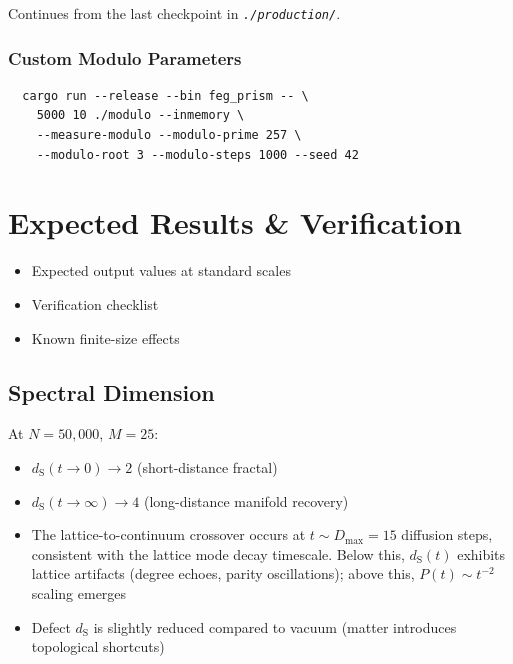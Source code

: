 \documentclass[11pt, a4paper, openany]{book}
\newcommand{\dS}{d_{\mathrm{S}}}
\newcommand{\file}[1]{\texttt{\itshape #1}}
\newenvironment{introduction}[1][Chapter Overview]{%
  \begin{tcolorbox}[
    enhanced,colback=structure!5,colframe=structure,
    colbacktitle=structure,coltitle=white,
    fonttitle=\small\bfseries,title={#1},
    arc=2pt,boxrule=0.7pt,
    left=8pt,right=8pt,top=6pt,bottom=6pt,
    before skip=12pt,after skip=12pt
  ]\itshape\begin{itemize}[leftmargin=*,itemsep=2pt,parsep=0pt]
}{%
  \end{itemize}\end{tcolorbox}
}
\begin{document}
Continues from the last checkpoint in \file{./production/}.

\subsection{Custom Modulo Parameters}

\begin{verbatim}
  cargo run --release --bin feg_prism -- \
    5000 10 ./modulo --inmemory \
    --measure-modulo --modulo-prime 257 \
    --modulo-root 3 --modulo-steps 1000 --seed 42
\end{verbatim}


\chapter{Expected Results \& Verification}

\begin{introduction}
  \item Expected output values at standard scales
  \item Verification checklist
  \item Known finite-size effects
\end{introduction}

\section{Spectral Dimension}

\begin{result}
  At $N = 50{,}000$, $M = 25$:
  \begin{itemize}
    \item $\dS(t \to 0) \to 2$ (short-distance fractal)
    \item $\dS(t \to \infty) \to 4$ (long-distance manifold recovery)
    \item The lattice-to-continuum crossover occurs at $t \sim D_{\max} = 15$
          diffusion steps, consistent with the lattice mode decay timescale.
          Below this, $\dS(t)$ exhibits lattice artifacts (degree echoes,
          parity oscillations); above this, $P(t) \sim t^{-2}$ scaling emerges
    \item Defect $\dS$ is slightly reduced compared to vacuum
          (matter introduces topological shortcuts)
  \end{itemize}
\end{result}
\end{document}
